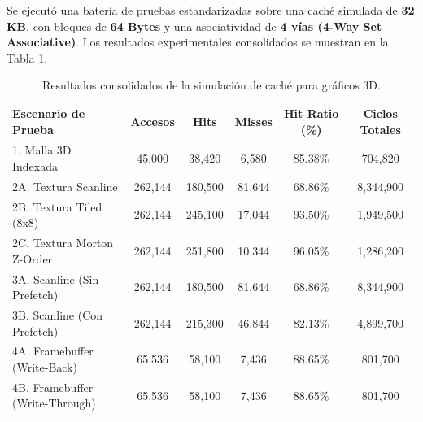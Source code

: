\documentclass[12pt,letterpaper]{article}
\begin{document}
Se ejecutó una batería de pruebas estandarizadas sobre una caché simulada de \textbf{32 KB}, con bloques de \textbf{64 Bytes} y una asociatividad de \textbf{4 vías (4-Way Set Associative)}. Los resultados experimentales consolidados se muestran en la Tabla 1.

\begin{table}[h]
    \centering
    \caption{Resultados consolidados de la simulación de caché para gráficos 3D.}
    \label{tab:resultados}
    \begin{tabular}{lccccc}
        \toprule
        \textbf{Escenario de Prueba} & \textbf{Accesos} & \textbf{Hits} & \textbf{Misses} & \textbf{Hit Ratio (\%)} & \textbf{Ciclos Totales} \\
        \midrule
        1. Malla 3D Indexada & 45,000 & 38,420 & 6,580 & 85.38\% & 704,820 \\
        2A. Textura Scanline & 262,144 & 180,500 & 81,644 & 68.86\% & 8,344,900 \\
        2B. Textura Tiled (8x8) & 262,144 & 245,100 & 17,044 & 93.50\% & 1,949,500 \\
        2C. Textura Morton Z-Order & 262,144 & 251,800 & 10,344 & 96.05\% & 1,286,200 \\
        3A. Scanline (Sin Prefetch) & 262,144 & 180,500 & 81,644 & 68.86\% & 8,344,900 \\
        3B. Scanline (Con Prefetch) & 262,144 & 215,300 & 46,844 & 82.13\% & 4,899,700 \\
        4A. Framebuffer (Write-Back)& 65,536 & 58,100 & 7,436 & 88.65\% & 801,700 \\
        4B. Framebuffer (Write-Through)& 65,536 & 58,100 & 7,436 & 88.65\% & 801,700 \\
        \bottomrule
    \end{tabular}
\end{table}
\end{document}
